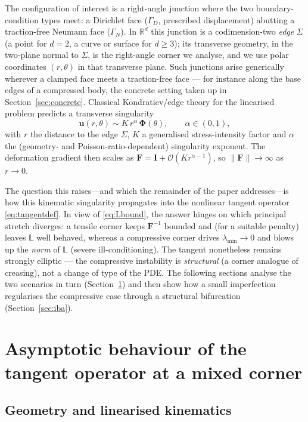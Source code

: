 The configuration of interest is a right-angle junction where the two boundary-condition types meet: a Dirichlet
face ($\Gamma_D$, prescribed displacement) abutting a traction-free Neumann face ($\Gamma_N$). In $\mathbb{R}^d$ this
junction is a codimension-two \emph{edge} $\Sigma$ (a point for $d=2$, a curve or surface for $d\ge3$); its transverse
geometry, in the two-plane normal to $\Sigma$, is the right-angle corner we analyse, and we use polar coordinates
$(r,\theta)$ in that transverse plane. Such junctions arise generically wherever a clamped face meets a traction-free
face --- for instance along the base edges of a compressed body, the concrete setting taken up in
Section~\ref{sec:concrete}. Classical Kondratiev/edge theory for the linearised problem predicts a transverse
singularity
\begin{equation}
    \bm{u}(r,\theta) \sim K\, r^{\alpha}\,\bm{\Phi}(\theta), \qquad \alpha \in (0,1),
\end{equation}
with $r$ the distance to the edge $\Sigma$, $K$ a generalised stress-intensity factor and
$\alpha$ the (geometry- and Poisson-ratio-dependent) singularity exponent. The deformation gradient then scales as
$\bm{F} = \bm{I} + \mathcal{O}(K r^{\alpha-1})$, so $\|\bm{F}\| \to \infty$ as $r \to 0$.

The question this raises---and which the remainder of the paper addresses---is how this kinematic singularity
propagates into the nonlinear tangent operator \eqref{eq:tangentdef}. In view of \eqref{eq:Lbound}, the answer hinges
on which principal stretch diverges: a tensile corner keeps $\bm{F}^{-1}$ bounded and (for a suitable penalty) leaves
$\mathbb{L}$ well behaved, whereas a compressive corner drives $\lambda_{\min} \to 0$ and blows up the \emph{norm} of
$\mathbb{L}$ (severe ill-conditioning). The tangent nonetheless remains strongly elliptic --- the compressive
instability is \emph{structural} (a corner analogue of creasing), not a change of type of the PDE. The following
sections analyse the two scenarios in turn (Section~\ref{sec:asymptotics}) and then show how a small imperfection
regularises the compressive case through a structural bifurcation (Section~\ref{sec:iba}).

\section{Asymptotic behaviour of the tangent operator at a mixed corner}
\label{sec:asymptotics}

\subsection{Geometry and linearised kinematics}

